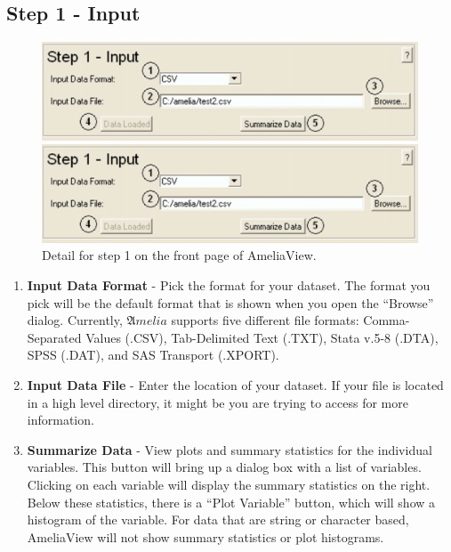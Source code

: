 \documentclass[12pt,titlepage]{article}
\begin{document}
\subsection{Step 1 - Input}
\label{sec:step1}
\begin{figure}[ht]
 \begin{htmlonly} 
  \centering \includegraphics[scale=1]{step1} 
 \end{htmlonly}
 \begin{latexonly}
  \centering \includegraphics[scale=.75]{step1}
 \end{latexonly}
  \caption{Detail for step 1 on the front page of AmeliaView.}
\end{figure}
\begin{enumerate}
\item \textbf{Input Data Format} - Pick the format for your dataset.
  The format you pick will be the default format that is shown when
  you open the ``Browse'' dialog.  Currently, ${\mathfrak Amelia}$
  supports five different file formats: Comma-Separated Values (.CSV),
  Tab-Delimited Text (.TXT), Stata v.5-8 (.DTA), SPSS (.DAT), and SAS
  Transport (.XPORT).
\item \textbf{Input Data File} - Enter the location of your dataset.
  If your file is located in a high level directory, it might be
  you are trying to access for more information.
\item \textbf{Summarize Data} - View plots and summary statistics for
  the individual variables.  This button will bring up a dialog box
  with a list of variables.  Clicking on each variable will display
  the summary statistics on the right.  Below these statistics, there
  is a ``Plot Variable'' button, which will show a histogram of the
  variable.  For data that are string or character based, AmeliaView
  will not show summary statistics or plot histograms.
\end{enumerate}
\end{document}
